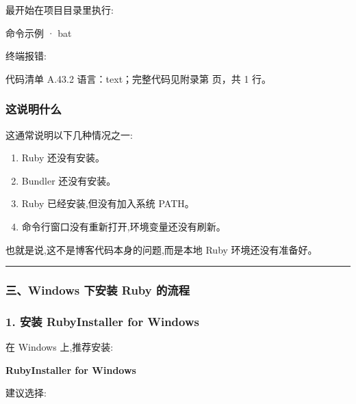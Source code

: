 \documentclass[lang=cn,scheme=chinese,color=blue,device=normal,toc=onecol,math=cm]{elegantbook}
\begin{document}
最开始在项目目录里执行:\par


\begin{inlinecodebox}{命令示例 · bat}
\end{inlinecodebox}


终端报错:\par


\begin{codeindexbox}{代码清单 A.43.2}
语言：text；完整代码见附录第 \pageref{code:43:2} 页，共 1 行。
\end{codeindexbox}


\subsubsection{这说明什么}


这通常说明以下几种情况之一:\par


\begin{enumerate}
\item Ruby 还没有安装。
\item Bundler 还没有安装。
\item Ruby 已经安装,但没有加入系统 PATH。
\item 命令行窗口没有重新打开,环境变量还没有刷新。
\end{enumerate}


也就是说,这不是博客代码本身的问题,而是本地 Ruby 环境还没有准备好。\par


\medskip\hrule\medskip


\subsubsection{三、Windows 下安装 Ruby 的流程}


\subsubsection{1. 安装 RubyInstaller for Windows}


在 Windows 上,推荐安装:\par


\textbf{RubyInstaller for Windows}\par


建议选择:\par
\end{document}
